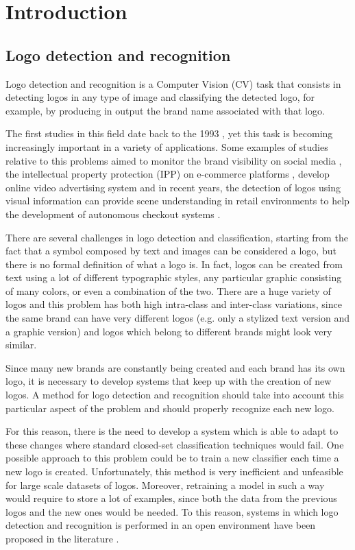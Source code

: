 \chapter{Introduction}
\label{chap:introduction}

\section{Logo detection and recognition}

Logo detection and recognition is a Computer Vision (CV) task that consists in detecting logos in any type of image and classifying the detected logo, for example, by producing in output the brand name associated with that logo. 

The first studies in this field date back to the 1993 \cite{doermann1993logo}, yet this task is becoming increasingly important in a variety of applications. Some examples of studies relative to this problems aimed to monitor the brand visibility on social media \cite{7492197}, the intellectual property protection (IPP) on e-commerce platforms \cite{jin2020open}, develop online video advertising system \cite{cheng2017video} and in recent years, the detection of logos using visual information can provide scene understanding in retail environments to help the development of autonomous checkout systems \cite{mata2022standardsim}.

There are several challenges in logo detection and classification, starting from the fact that a symbol composed by text and images can be considered a logo, but there is no formal definition of what a logo is. In fact, logos can be created from text using a lot of different typographic styles, any particular graphic consisting of many colors, or even a combination of the two.
There are a huge variety of logos and this problem has both high intra-class and inter-class variations, since the same brand can have very different logos (e.g. only a stylized text version and a graphic version) and logos which belong to different brands might look very similar.

Since many new brands are constantly being created and each brand has its own logo, it is necessary to develop systems that keep up with the creation of new logos. A method for logo detection and recognition should take into account this particular aspect of the problem and should properly recognize each new logo.

For this reason, there is the need to develop a system which is able to adapt to these changes where standard closed-set classification techniques would fail. One possible approach to this problem could be to train a new classifier each time a new logo is created. Unfortunately, this method is very inefficient and unfeasible for large scale datasets of logos. Moreover, retraining a model in such a way would require to store a lot of examples, since both the data from the previous logos and the new ones would be needed. To this reason, systems in which logo detection and recognition is performed in an open environment have been proposed in the literature \cite{fehervari2019scalable,li2022seetek}.

